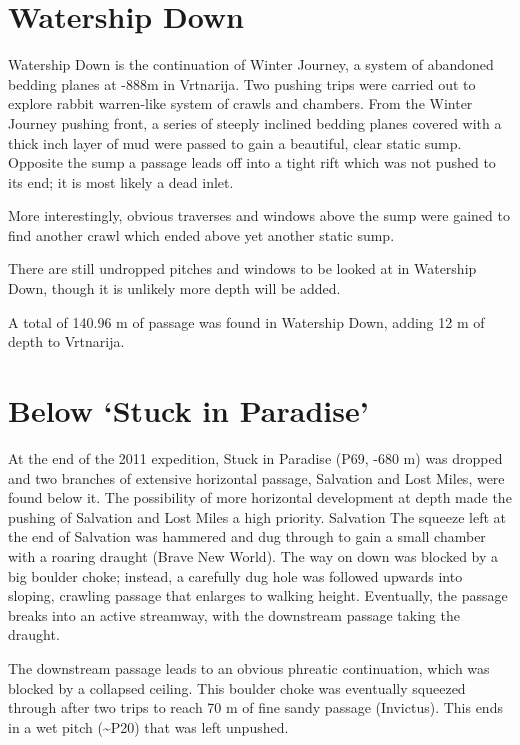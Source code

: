 \section{Watership Down}\label{watership-down}

Watership Down is the continuation of Winter Journey, a system of
abandoned bedding planes at -888m in Vrtnarija. Two pushing trips were
carried out to explore rabbit warren-like system of crawls and chambers.
From the Winter Journey pushing front, a series of steeply inclined
bedding planes covered with a thick inch layer of mud were passed to
gain a beautiful, clear static sump. Opposite the sump a passage leads
off into a tight rift which was not pushed to its end; it is most likely
a dead inlet.

More interestingly, obvious traverses and windows above the sump were
gained to find another crawl which ended above yet another static sump.

There are still undropped pitches and windows to be looked at in
Watership Down, though it is unlikely more depth will be added.

A total of 140.96 m of passage was found in Watership Down, adding 12 m
of depth to Vrtnarija.

\section{\texorpdfstring{Below `Stuck in
Paradise'}{Below Stuck in Paradise}}\label{below-stuck-in-paradise}

At the end of the 2011 expedition, Stuck in Paradise (P69, -680 m) was
dropped and two branches of extensive horizontal passage, Salvation and
Lost Miles, were found below it. The possibility of more horizontal
development at depth made the pushing of Salvation and Lost Miles a high
priority. Salvation The squeeze left at the end of Salvation was
hammered and dug through to gain a small chamber with a roaring draught
(Brave New World). The way on down was blocked by a big boulder choke;
instead, a carefully dug hole was followed upwards into sloping,
crawling passage that enlarges to walking height. Eventually, the
passage breaks into an active streamway, with the downstream passage
taking the draught.

The downstream passage leads to an obvious phreatic continuation, which
was blocked by a collapsed ceiling. This boulder choke was eventually
squeezed through after two trips to reach 70 m of fine sandy passage
(Invictus). This ends in a wet pitch (\textasciitilde{}P20) that was
left unpushed.

